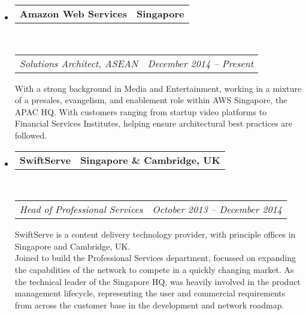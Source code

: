 \documentclass[10pt,a4paper]{article}
\makeatletter
\newcommand{\headerrow}[2]
{\begin{tabular*}{\linewidth}{l@{\extracolsep{\fill}}r}
    #1 &
    #2 \\
\end{tabular*}}
\makeatother
\begin{document}
\begin{itemize}
    \parskip=0.1em

    \item
        \headerrow
            {\textbf{Amazon Web Services}}
            {\textbf{Singapore}}
        \\
        \headerrow
            {\emph{Solutions Architect, ASEAN}}
            {\emph{December 2014 -- Present}}
            
            With a strong background in Media and Entertainment, working in a mixture of a presales, evangelism, and enablement role within AWS Singapore, the APAC HQ. With customers ranging from startup video platforms to Financial Services Institutes, helping ensure architectural best practices are followed. 
            


    \item
        \headerrow
            {\textbf{SwiftServe}}
            {\textbf{Singapore \& Cambridge, UK}}
        \\
        \headerrow
            {\emph{Head of Professional Services}}
            {\emph{October 2013 -- December 2014}}
    
            SwiftServe is a content delivery technology provider, with principle offices in Singapore and Cambridge, UK.
            \\
            Joined to build the Professional Services department, focussed on expanding the capabilities of the network to compete in a quickly changing market. As the technical leader of the Singapore HQ, was heavily involved in the product management lifecycle, representing the user and commercial requirements from across the customer base in the development and network roadmap.
            

\end{itemize}
\end{document}
